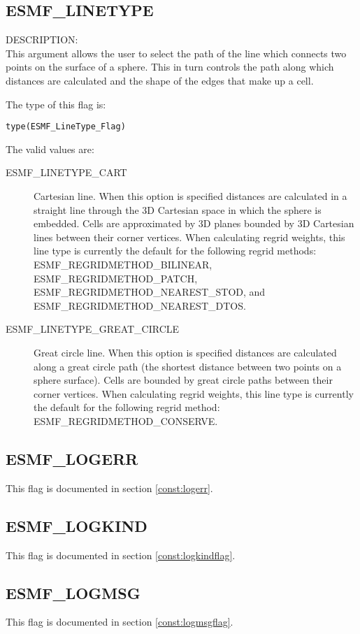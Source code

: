 \subsection{ESMF\_LINETYPE}
\label{opt:lineType}

{\sf DESCRIPTION:\\}  This argument allows the user to select the path of the line which connects two points on the surface of a sphere.
This in turn controls the path along which distances are calculated and the shape of the edges that make up a cell. 

The type of this flag is:

{\tt type(ESMF\_LineType\_Flag)}

The valid values are:
 \begin{description}
\item [ESMF\_LINETYPE\_CART]
   Cartesian line. When this option is specified distances are calculated in a straight line through the 3D Cartesian space
   in which the sphere is embedded. Cells are approximated by 3D planes bounded by 3D Cartesian lines between their corner vertices. 
   When calculating regrid weights, this line type is currently the default for the following regrid methods: ESMF\_REGRIDMETHOD\_BILINEAR, 
   ESMF\_REGRIDMETHOD\_PATCH, ESMF\_REGRIDMETHOD\_NEAREST\_STOD, and  ESMF\_REGRIDMETHOD\_NEAREST\_DTOS.
\item [ESMF\_LINETYPE\_GREAT\_CIRCLE]
   Great circle line. When this option is specified distances are calculated along a great circle path (the shortest distance
   between two points on a sphere surface). Cells are bounded by great circle paths between their corner vertices. When calculating regrid 
   weights, this line type is currently the default for the following regrid method: ESMF\_REGRIDMETHOD\_CONSERVE. 
\end{description}


\subsection{ESMF\_LOGERR}
This flag is documented in section \ref{const:logerr}.

\subsection{ESMF\_LOGKIND}
This flag is documented in section \ref{const:logkindflag}.

\subsection{ESMF\_LOGMSG}
This flag is documented in section \ref{const:logmsgflag}.

